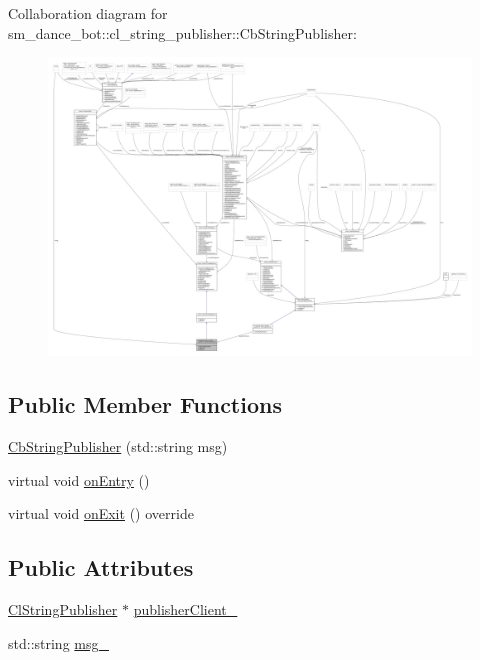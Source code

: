 Collaboration diagram for sm\+\_\+dance\+\_\+bot\+:\+:cl\+\_\+string\+\_\+publisher\+:\+:Cb\+String\+Publisher\+:
\nopagebreak
\begin{figure}[H]
\begin{center}
\leavevmode
\includegraphics[width=350pt]{classsm__dance__bot_1_1cl__string__publisher_1_1CbStringPublisher__coll__graph}
\end{center}
\end{figure}
\subsection*{Public Member Functions}
\begin{DoxyCompactItemize}
\item 
\hyperlink{classsm__dance__bot_1_1cl__string__publisher_1_1CbStringPublisher_abe08b99960be5c26acce0cb062ceea5f}{Cb\+String\+Publisher} (std\+::string msg)
\item 
virtual void \hyperlink{classsm__dance__bot_1_1cl__string__publisher_1_1CbStringPublisher_a7aa533578e820ee90d92d15b85d42e9b}{on\+Entry} ()
\item 
virtual void \hyperlink{classsm__dance__bot_1_1cl__string__publisher_1_1CbStringPublisher_ac93cc1eb150140331cb3e560ec8249e2}{on\+Exit} () override
\end{DoxyCompactItemize}
\subsection*{Public Attributes}
\begin{DoxyCompactItemize}
\item 
\hyperlink{classsm__dance__bot_1_1cl__string__publisher_1_1ClStringPublisher}{Cl\+String\+Publisher} $\ast$ \hyperlink{classsm__dance__bot_1_1cl__string__publisher_1_1CbStringPublisher_aafcad6e6296a3088cb91ffeb22025bd6}{publisher\+Client\+\_\+}
\item 
std\+::string \hyperlink{classsm__dance__bot_1_1cl__string__publisher_1_1CbStringPublisher_a320ff6940dc15b469af3679d2d2eb655}{msg\+\_\+}
\end{DoxyCompactItemize}
